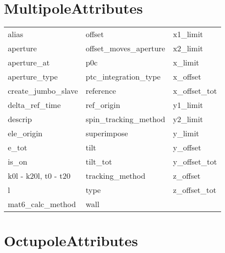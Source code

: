  \section{MultipoleAttributes}
 \label{s:list.multipole}
 
 \begin{tabular}{lll} \toprule
alias                       & offset                      & x1_limit                    \\
aperture                    & offset_moves_aperture       & x2_limit                    \\
aperture_at                 & p0c                         & x_limit                     \\
aperture_type               & ptc_integration_type        & x_offset                    \\
create_jumbo_slave          & reference                   & x_offset_tot                \\
delta_ref_time              & ref_origin                  & y1_limit                    \\
descrip                     & spin_tracking_method        & y2_limit                    \\
ele_origin                  & superimpose                 & y_limit                     \\
e_tot                       & tilt                        & y_offset                    \\
is_on                       & tilt_tot                    & y_offset_tot                \\
k0l - k20l, t0 - t20        & tracking_method             & z_offset                    \\
l                           & type                        & z_offset_tot                \\
mat6_calc_method            & wall                        &                             \\
 \bottomrule
 \end{tabular}
 \vfill
 
 \section{OctupoleAttributes}
 \label{s:list.octupole}
 
